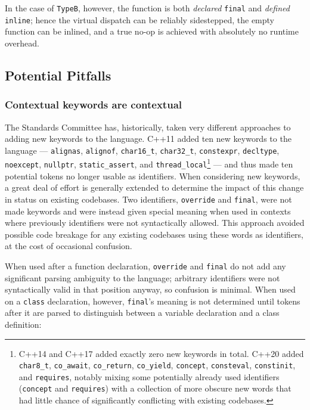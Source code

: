 {In the case of \lstinline!TypeB!, however, the function is both
\emph{declared} \lstinline!final! and \emph{defined} \lstinline!inline!; hence
the virtual dispatch can be reliably sidestepped, the empty function can
be inlined, and a true no-op is achieved with absolutely no runtime
overhead.

\subsection[Potential Pitfalls]{Potential Pitfalls}\label{potential-pitfalls-final}

\subsubsection[Contextual keywords are contextual]{Contextual keywords are contextual}\label{contextual-keywords-are-contextual}

The Standards Committee has, historically, taken very different
approaches to adding new keywords to the language. C++11 added ten new
keywords to the language --- \lstinline!alignas!, \lstinline!alignof!,
\lstinline!char16_t!, \lstinline!char32_t!, \lstinline!constexpr!,
\lstinline!decltype!, \lstinline!noexcept!, \lstinline!nullptr!,
\lstinline!static_assert!, and
\lstinline!thread_local!{\cprotect\footnote{C++14 and C++17 added exactly
zero new keywords in total. C++20 added \lstinline!char8_t!,
\lstinline!co_await!, \lstinline!co_return!, \lstinline!co_yield!,
\lstinline!concept!, \lstinline!consteval!, \lstinline!constinit!, and
\lstinline!requires!, notably mixing some potentially already used
identifiers (\lstinline!concept! and \lstinline!requires!) with a collection
of more obscure new words that had little chance of significantly
  conflicting with existing codebases.}} --- and thus made ten potential
tokens no longer usable as identifiers. When considering new keywords, a
great deal of effort is generally extended to determine the impact of
this change in status on existing codebases. Two identifiers,
\lstinline!override! and \lstinline!final!, were not made keywords and were
instead given special meaning when used in contexts where previously
identifiers were not syntactically allowed. This approach avoided
possible code breakage for any existing codebases using these words as
identifiers, at the cost of occasional confusion.

When used after a function declaration, \lstinline!override! and
\lstinline!final! do not add any significant parsing ambiguity to the
language; arbitrary identifiers were not syntactically valid in that
position anyway, so confusion is minimal. When used on a \lstinline!class!
declaration, however, \lstinline!final!'s meaning is not determined until
tokens after it are parsed to distinguish between a variable declaration
and a class definition:

}

